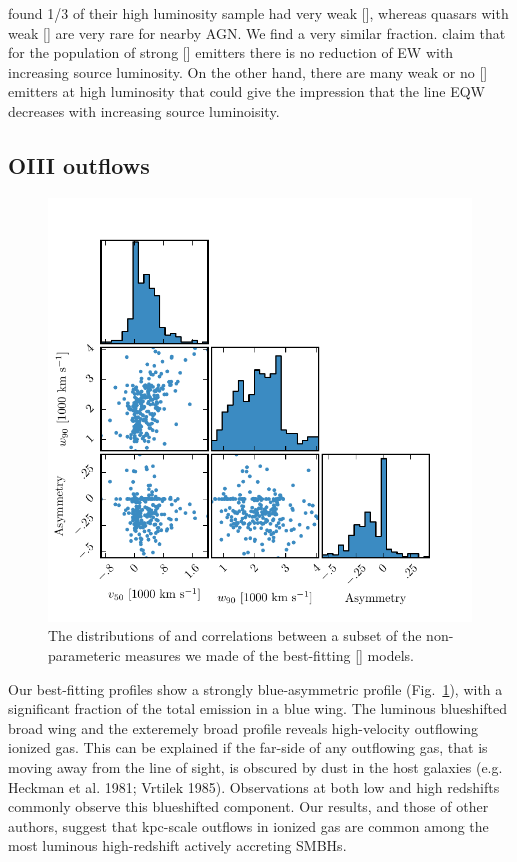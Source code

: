 \citet{netzer04} found 1/3 of their high luminosity sample had very weak [], whereas quasars with weak [] are very rare for nearby AGN. 
We find a very similar fraction. 
\citet{netzer04} claim that for the population of strong [] emitters there is no reduction of EW with increasing source luminosity. 
On the other hand, there are many weak or no [] emitters at high luminosity that could give the impression that the line EQW decreases with increasing source luminoisity. 

\subsection{OIII outflows}

\begin{figure}
    \includegraphics[width=\columnwidth]{figures/chapter04/parameters_grid.pdf} 
    \caption{The distributions of and correlations between a subset of the non-parameteric measures we made of the best-fitting [] models.}     
    \label{fig:parameters_grid}
\end{figure}

Our best-fitting profiles show a strongly blue-asymmetric profile (Fig.~\ref{fig:parameters_grid}), with a significant fraction of the total emission in a blue wing.
The luminous blueshifted broad wing and the exteremely broad profile reveals high-velocity outflowing ionized gas. 
This can be explained if the far-side of any outflowing gas, that is moving away from the line of sight, is obscured by dust in the host galaxies (e.g. Heckman et al. 1981; Vrtilek 1985). 
Observations at both low and high redshifts commonly observe this blueshifted component.  
Our results, and those of other authors, suggest that kpc-scale outflows in ionized gas are common among the most luminous high-redshift actively accreting SMBHs.

